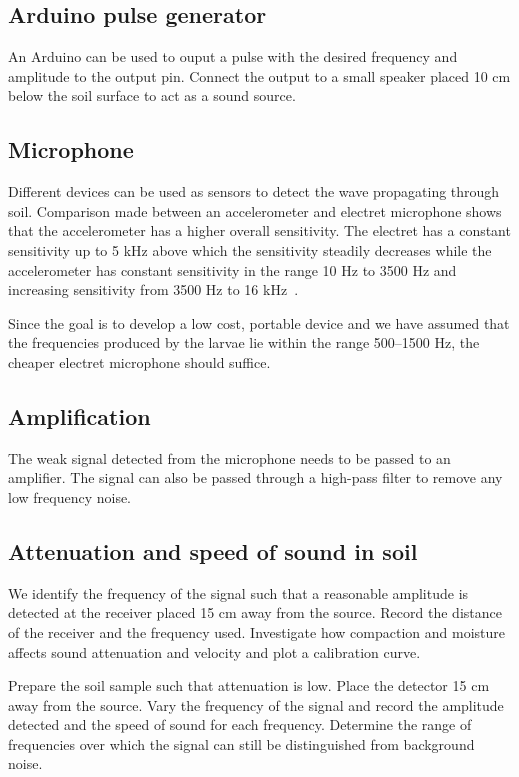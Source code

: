 \documentclass[twocolumn]{article}
\begin{document}
\subsection{Arduino pulse generator}
An Arduino can be used to ouput a pulse with the desired frequency and amplitude to the output pin. Connect the output to a small speaker placed 10 cm below the soil surface to act as a sound source.

\subsection{Microphone}
Different devices can be used as sensors to detect the wave propagating through soil. Comparison made between an accelerometer and electret microphone shows that the accelerometer has a higher overall sensitivity. The electret has a constant sensitivity up to 5 kHz above which the sensitivity steadily decreases while the accelerometer has constant sensitivity in the range 10 Hz to 3500 Hz and increasing sensitivity from 3500 Hz to 16 kHz~\cite{eavesdropInsect}.

Since the goal is to develop a low cost, portable device and we have assumed that the frequencies produced by the larvae lie within the range 500--1500 Hz, the cheaper electret microphone should suffice.

\subsection{Amplification}
The weak signal detected from the microphone needs to be passed to an amplifier. The signal can also be passed through a high-pass filter to remove any low frequency noise.

\subsection{Attenuation and speed of sound in soil}
We identify the frequency of the signal such that a reasonable amplitude is detected at the receiver placed 15 cm away from the source. Record the distance of the receiver and the frequency used. Investigate how compaction and moisture affects sound attenuation and velocity and plot a calibration curve.

Prepare the soil sample such that attenuation is low. Place the detector 15 cm away from the source. Vary the frequency of the signal and record the amplitude detected and the speed of sound for each frequency. Determine the range of frequencies over which the signal can still be distinguished from background noise.
\end{document}
